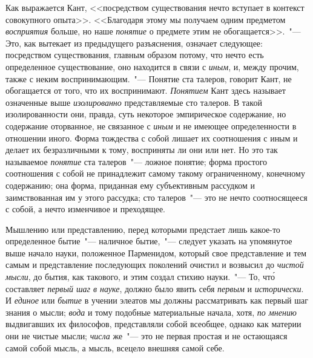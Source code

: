 Как выражается Кант, <<посредством существования
нечто вступает в контекст совокупного опыта>>. <<Благодаря
этому мы получаем одним предметом \emph{восприятия}
больше, но наше \emph{понятие} о предмете этим не обогащается>>\endnotemark{}.~"---
Это, как вытекает из предыдущего разъяснения,
означает следующее: посредством существования, главным
образом потому, что нечто есть определенное существование,
оно находится в связи с \emph{иным}, и, между
прочим, также с неким воспринимающим.~"--- Понятие ста
талеров, говорит Кант, не обогащается от того, что их
воспринимают. \emph{Понятием} Кант здесь называет означенные
выше \emph{изолированно} представляемые сто талеров.
В такой изолированности они, правда, суть некоторое
эмпирическое содержание, но содержание оторванное, не
связанное с \emph{иным} и не имеющее определенности в отношении
иного. Форма тождества с собой лишает их соотношения
с иным и делает их безразличными к тому,
восприняты ли они или нет. Но это так называемое \emph{понятие}
ста талеров~"--- ложное понятие; форма простого
соотношения с собой не принадлежит самому такому
ограниченному, конечному содержанию; она форма, приданная
ему субъективным рассудком и заимствованная
им у этого рассудка; сто талеров~"--- это не нечто соотносящееся
с собой, а нечто изменчивое и преходящее.


Мышлению или представлению, перед которыми предстает
лишь какое-то определенное бытие~"--- наличное бытие,~"---
следует указать на упомянутое выше начало
науки, положенное Парменидом, который свое представление
и тем самым и представление последующих поколений
очистил и возвысил до \emph{чистой мысли}, до бытия,
как такового, и этим создал стихию науки.~"--- То, чт\'о
составляет \emph{первый шаг в науке}, должно было явить себя
\emph{первым} и \emph{исторически}. И \emph{единое} или \emph{бытие} в учении
элеатов мы должны рассматривать как первый шаг знания
о мысли; \emph{вода} и тому подобные материальные начала,
хотя, \emph{по мнению} выдвигавших их философов, представляли
собой всеобщее, однако как материи они не чистые
мысли; \emph{числа}
же~"--- это не первая простая и не
остающаяся самой собой мысль, а мысль, всецело внешняя
самой себе.

